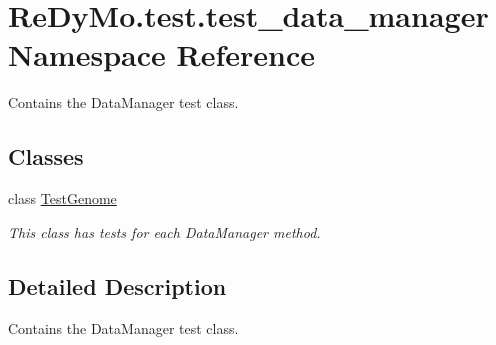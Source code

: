 \hypertarget{namespaceReDyMo_1_1test_1_1test__data__manager}{}\section{Re\+Dy\+Mo.\+test.\+test\+\_\+data\+\_\+manager Namespace Reference}
\label{namespaceReDyMo_1_1test_1_1test__data__manager}


Contains the Data\+Manager test class.  


\subsection*{Classes}
\begin{DoxyCompactItemize}
\item 
class \mbox{\hyperlink{classReDyMo_1_1test_1_1test__data__manager_1_1TestGenome}{Test\+Genome}}
\begin{DoxyCompactList}\small\item\em This class has tests for each Data\+Manager method. \end{DoxyCompactList}\end{DoxyCompactItemize}


\subsection{Detailed Description}
Contains the Data\+Manager test class. 